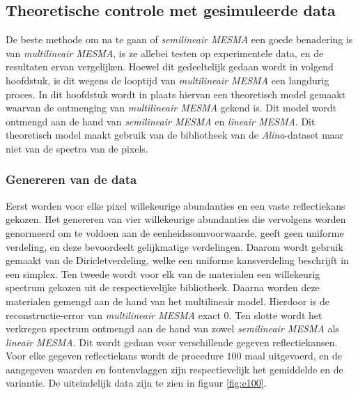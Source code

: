 \documentclass[12pt]{report}
\begin{document}
\subsection{Theoretische controle met gesimuleerde data} \label{sec:tc}

De beste methode om na te gaan of \textit{semilineair MESMA} een goede benadering is van \textit{multilineair MESMA}, is ze allebei testen op experimentele data, en de resultaten ervan vergelijken. Hoewel dit gedeeltelijk gedaan wordt in volgend hoofdstuk, is dit wegens de looptijd van \textit{multilineair MESMA} een langdurig proces. In dit hoofdstuk wordt in plaats hiervan een theoretisch model gemaakt waarvan de ontmenging van \textit{multilineair MESMA} gekend is. Dit model wordt ontmengd aan de hand van \textit{semilineair MESMA} en \textit{lineair MESMA}. Dit theoretisch model maakt gebruik van de bibliotheek van de \textit{Alina}-dataset maar niet van de spectra van de pixels.

\subsubsection{Genereren van de data}

Eerst worden voor elke pixel willekeurige abundanties en een vaste reflectiekans gekozen. Het genereren van vier willekeurige abundanties die vervolgens worden genormeerd om te voldoen aan de eenheidssomvoorwaarde, geeft geen uniforme verdeling, en deze bevoordeelt gelijkmatige verdelingen. Daarom wordt gebruik gemaakt van de Diricletverdeling, welke een uniforme kansverdeling beschrijft in een simplex. Ten tweede wordt voor elk van de materialen een willekeurig spectrum gekozen uit de respectievelijke bibliotheek. Daarna worden deze materialen gemengd aan de hand van het multilineair model. Hierdoor is de reconstructie-error van \textit{multilineair MESMA} exact 0. Ten slotte wordt het verkregen spectrum ontmengd aan de hand van zowel \textit{semilineair MESMA} als \textit{lineair MESMA}. Dit wordt gedaan voor verschillende gegeven reflectiekansen. Voor elke gegeven reflectiekans wordt de procedure $100$ maal uitgevoerd, en de aangegeven waarden en foutenvlaggen zijn respectievelijk het gemiddelde en de variantie. De uiteindelijk data zijn te zien in figuur \ref{fig:e100}.
\end{document}
